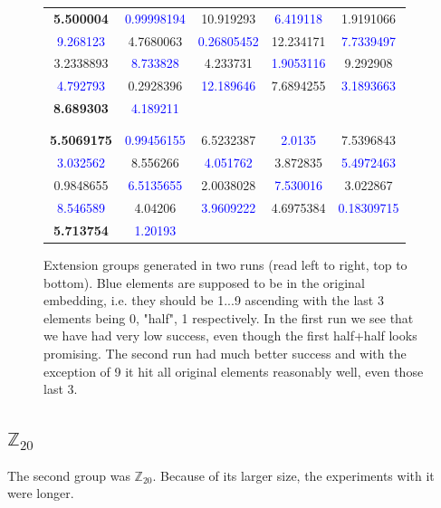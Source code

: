\begin{figure}[h]
\centering
\caption{Extension groups generated in two runs (read left to right, top to bottom). Blue elements are supposed to be in the original embedding, i.e. they should be 1...9 ascending with the last 3 elements being 0, "half", 1 respectively. In the first run we see that we have had very low success, even though the first half+half looks promising. The second run had much better success and with the exception of 9 it hit all original elements reasonably well, even those last 3.}
\label{table:z10_half_generator}
\begin{tabular}{ccccc}
\textbf{5.500004} & \textcolor{blue}{0.99998194} & 10.919293 & \textcolor{blue}{6.419118} & 1.9191066\\
 \textcolor{blue}{9.268123} & 4.7680063 & \textcolor{blue}{0.26805452} & 12.234171 & \textcolor{blue}{7.7339497}\\
3.2338893 & \textcolor{blue}{8.733828} & 4.233731 & \textcolor{blue}{1.9053116} & 9.292908 \\
\textcolor{blue}{4.792793} & 0.2928396 & \textcolor{blue}{12.189646} & 7.6894255 & \textcolor{blue}{3.1893663}\\
\textbf{8.689303} & \textcolor{blue}{4.189211}\\
 \\
\hline\\

\textbf{5.5069175} & \textcolor{blue}{0.99456155} & 6.5232387 & \textcolor{blue}{2.0135} & 7.5396843\\
\textcolor{blue}{3.032562} & 8.556266 & \textcolor{blue}{4.051762} & 3.872835 & \textcolor{blue}{5.4972463}\\
0.9848655 & \textcolor{blue}{6.5135655} & 2.0038028 & \textcolor{blue}{7.530016} & 3.022867\\
\textcolor{blue}{8.546589} & 4.04206 & \textcolor{blue}{3.9609222} & 4.6975384 & \textcolor{blue}{0.18309715}\\
\textbf{5.713754} & \textcolor{blue}{1.20193}
\end{tabular}

\end{figure}


\subsection{$\mathbb{Z}_{20}$}
The second group was $\mathbb{Z}_{20}$. Because of its larger size, the experiments with it were longer. 


